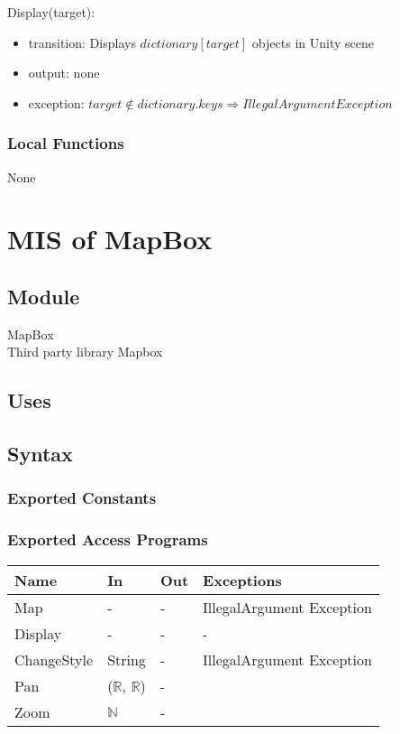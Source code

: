 \documentclass[12pt, titlepage]{article}
\begin{document}
\noindent Display(target):
\begin{itemize}
\item transition: Displays $dictionary[target]$ objects in Unity scene
\item output: none
\item exception: $target \notin dictionary.keys \Rightarrow IllegalArgument Exception$
\end{itemize}

\subsubsection{Local Functions}

None

\newpage

\section{MIS of MapBox} \label{mMap}

\subsection{Module}

MapBox\\
Third party library Mapbox

\subsection{Uses}

\subsection{Syntax}

\subsubsection{Exported Constants}

\subsubsection{Exported Access Programs}

\begin{center}
\begin{tabular}{p{2cm} p{4cm} p{4cm} p{2cm}}
\hline
\textbf{Name} & \textbf{In} & \textbf{Out} & \textbf{Exceptions} \\
\hline
Map & - & - & IllegalArgument Exception\\
Display & - & - & - \\
ChangeStyle & String & - & IllegalArgument Exception\\
Pan & ($\mathbb{R}$, $\mathbb{R}$) & -\\
Zoom &  $\mathbb{N}$ & -\\

\hline
\end{tabular}
\end{center}
\end{document}
